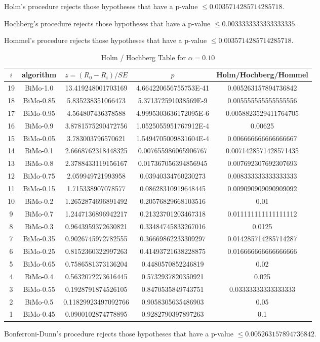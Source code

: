\documentclass[a4paper,10pt]{article}
\begin{document}
\begin{landscape}
Holm's procedure rejects those hypotheses that have a p-value $\le0.0035714285714285718$.


Hochberg's procedure rejects those hypotheses that have a p-value $\le0.0033333333333333335$.


Hommel's procedure rejects those hypotheses that have a p-value $\le0.0035714285714285718$.


\begin{table}[!htp]
\centering\tiny
\caption{Holm / Hochberg Table for $\alpha=0.10$}
\begin{tabular}{ccccc}
$i$&algorithm&$z=(R_0 - R_i)/SE$&$p$&Holm/Hochberg/Hommel\\
\hline
19&BiMo-1.0&13.419248001703169&4.664220656755753E-41&0.005263157894736842\\
18&BiMo-0.85&5.835238351066473&5.371372591038569E-9&0.005555555555555556\\
17&BiMo-0.95&4.564807436378588&4.9995303636172095E-6&0.0058823529411764705\\
16&BiMo-0.9&3.8781575290472756&1.0525055951767912E-4&0.00625\\
15&BiMo-0.05&3.783003796570621&1.5494705009831604E-4&0.006666666666666667\\
14&BiMo-0.1&2.6668762318448325&0.007655986065906767&0.0071428571428571435\\
13&BiMo-0.8&2.3788433119156167&0.017367056394856945&0.007692307692307693\\
12&BiMo-0.75&2.059949721993958&0.03940334760230273&0.008333333333333333\\
11&BiMo-0.15&1.715338907078577&0.08628310919648445&0.009090909090909092\\
10&BiMo-0.2&1.2652874696891492&0.20576829668103516&0.01\\
9&BiMo-0.7&1.2447136896942217&0.21323701203467318&0.011111111111111112\\
8&BiMo-0.3&0.9643959372630821&0.33484745833267016&0.0125\\
7&BiMo-0.35&0.9026745972782555&0.36669862233309297&0.014285714285714287\\
6&BiMo-0.25&0.8152360322997263&0.41493721638228875&0.016666666666666666\\
5&BiMo-0.65&0.7586581373136204&0.4480570852246819&0.02\\
4&BiMo-0.4&0.5632072273616445&0.5732937820350921&0.025\\
3&BiMo-0.55&0.1928791874526105&0.8470535849743751&0.03333333333333333\\
2&BiMo-0.5&0.11829923497092766&0.9058305635486903&0.05\\
1&BiMo-0.45&0.0900102874778895&0.9282790397897263&0.1\\
\hline
\end{tabular}
\end{table}
Bonferroni-Dunn's procedure rejects those hypotheses that have a p-value $\le0.005263157894736842$.



\end{landscape}
\end{document}
